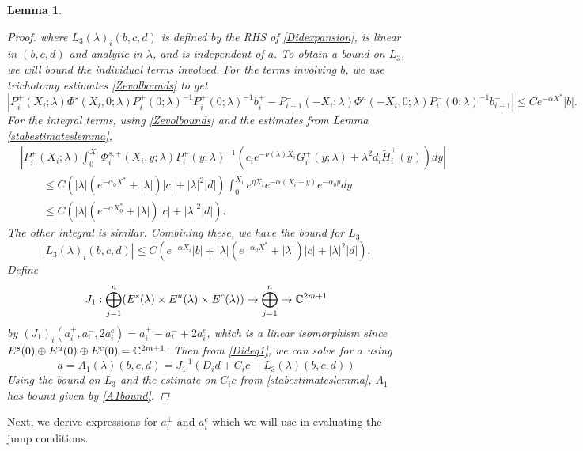 \documentclass[10pt,reqno]{amsart}
\theoremstyle{plain}
\newtheorem{lemma}[theorem]{Lemma}
\theoremstyle{definition}
\theoremstyle{remark}
\numberwithin{theorem}{section}
\numberwithin{equation}{section}
\begin{document}
\begin{lemma}
\begin{proof}
where $L_3(\lambda)_i(b, c, d)$ is defined by the RHS of \cref{Didexpansion}, is linear in $(b,c,d)$ and analytic in $\lambda$, and is independent of $a$. To obtain a bound on $L_3$, we will bound the individual terms involved. For the terms involving $b$, we use trichotomy estimates \eqref{Zevolbounds} to get
\[
| P_i^+(X_i; \lambda)\Phi^s(X_i, 0; \lambda) P_i^+(0; \lambda)^{-1} P_i^+(0; \lambda)^{-1} b_i^+ - P_{i+1}^-(-X_i; \lambda) \Phi^u(-X_i, 0; \lambda) P_i^-(0; \lambda)^{-1} b_{i+1}^-| \leq C e^{-\alpha X^*} |b|.
\]
For the integral terms, using \eqref{Zevolbounds} and the estimates from Lemma \ref{stabestimateslemma},
\begin{align*}
&\left| P_i^+(X_i; \lambda) \int_0^{X_i} \Phi_i^{s,+}(X_i, y; \lambda)P_i^+(y; \lambda)^{-1} (c_i e^{-\nu(\lambda)X_i} G_i^+(y; \lambda) + \lambda^2 d_i \tilde{H}_i^+(y)) dy \right| \\
&\qquad \leq C \left( |\lambda|(e^{-\alpha_0 X^*}+ |\lambda|) |c| + |\lambda|^2 |d| \right) \int_0^{X_i} e^{\eta X_i} e^{-\alpha(X_i - y)} e^{-\alpha_0 y} dy \\
&\qquad \leq C \left( |\lambda|(e^{-\alpha X_0^*}+ |\lambda|) |c| + |\lambda|^2 |d| \right).
\end{align*}
The other integral is similar. Combining these, we have the bound for $L_3$
\begin{equation}\label{L3bound}
|L_3(\lambda)_i(b, c, d)| \leq C \left( e^{-\alpha X_i} |b| + |\lambda|(e^{-\alpha_0 X^*}+ |\lambda|) |c| + |\lambda|^2 |d| \right).
\end{equation}
Define
\[
J_1: \bigoplus_{j=1}^n (E^s(\lambda) \times E^u(
\lambda) \times E^c(\lambda) ) \rightarrow \bigoplus_{j=1}^n \rightarrow \mathbb{C}^{2m+1}
\]
by $(J_1)_i(a_i^+, a_i^-, 2 a_i^c) = a_i^+ - a_i^- + 2 a_i^c$, which is a linear isomorphism since $E^s(0) \oplus E^u(0) \oplus E^c(0) = \mathbb{C}^{2m+1}$. Then from \cref{Dideq1}, we can solve for $a$ using  
\[
a = A_1(\lambda)(b, c, d) = J_1^{-1} \left(D_i d + C_i c - L_3(\lambda)(b, c, d)\right)
\]
Using the bound on $L_3$ and the estimate on $C_i c$ from \cref{stabestimateslemma}, $A_1$ has bound given by \cref{A1bound}.
\end{proof}
\end{lemma}

Next, we derive expressions for $a_i^\pm$ and $a_i^c$ which we will use in evaluating the jump conditions.
\end{document}

